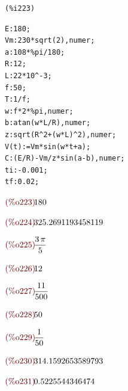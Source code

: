 \documentclass{article}
\begin{document}
\noindent
\begin{minipage}[t]{8ex}{\color{red}\bf
\begin{verbatim}
(%i223) 
\end{verbatim}}
\end{minipage}
\begin{minipage}[t]{\textwidth}{\color{blue}
\begin{verbatim}
E:180;
Vm:230*sqrt(2),numer;
a:108*%pi/180;
R:12;
L:22*10^-3;
f:50;
T:1/f;
w:f*2*%pi,numer;
b:atan(w*L/R),numer;
z:sqrt(R^2+(w*L)^2),numer;
V(t):=Vm*sin(w*t+a);
C:(E/R)-Vm/z*sin(a-b),numer;
ti:-0.001;
tf:0.02;
\end{verbatim}}
\end{minipage}
\begin{math}\displaystyle
\parbox{8ex}{\color{labelcolor}(\%o223) }
180
\end{math}

\begin{math}\displaystyle
\parbox{8ex}{\color{labelcolor}(\%o224) }
325.2691193458119
\end{math}

\begin{math}\displaystyle
\parbox{8ex}{\color{labelcolor}(\%o225) }
\frac{3\,\pi }{5}
\end{math}

\begin{math}\displaystyle
\parbox{8ex}{\color{labelcolor}(\%o226) }
12
\end{math}

\begin{math}\displaystyle
\parbox{8ex}{\color{labelcolor}(\%o227) }
\frac{11}{500}
\end{math}

\begin{math}\displaystyle
\parbox{8ex}{\color{labelcolor}(\%o228) }
50
\end{math}

\begin{math}\displaystyle
\parbox{8ex}{\color{labelcolor}(\%o229) }
\frac{1}{50}
\end{math}

\begin{math}\displaystyle
\parbox{8ex}{\color{labelcolor}(\%o230) }
314.1592653589793
\end{math}

\begin{math}\displaystyle
\parbox{8ex}{\color{labelcolor}(\%o231) }
0.5225544346474
\end{math}
\end{document}
